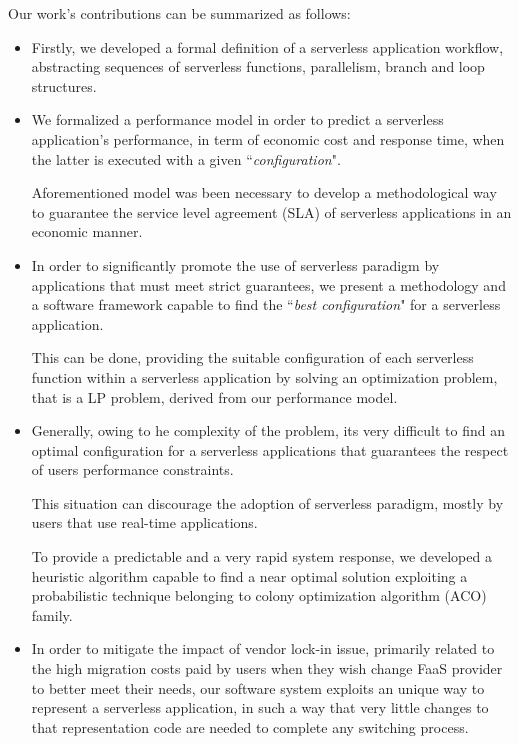 \documentclass[12pt,a4paper]{report}
\begin{document}
Our work's contributions can be summarized as follows:

\begin{itemize}
	\item Firstly, we developed a formal definition of a serverless application workflow, abstracting sequences of serverless functions, parallelism, branch and loop structures.
	
	\item We formalized a performance model in order to predict a serverless application's performance, in term of economic cost and response time, when the latter is executed with a given ``\textit{configuration}". 
	
	Aforementioned model was been necessary to develop a methodological way to guarantee the service level agreement (SLA) of serverless applications in an economic manner.
	
	\item In order to significantly promote the use of serverless paradigm by applications that must meet strict guarantees, we present a methodology and a software framework capable to find the ``\textit{best configuration}" for a serverless application.
	
	This can be done, providing the suitable configuration of each serverless function within a serverless application by solving an optimization
	problem, that is a LP problem, derived from our performance model.
	
	\item Generally, owing to he complexity of the problem, its very difficult to find an optimal configuration for a serverless applications that guarantees the respect of users performance constraints. 
	
	This situation can discourage the adoption of serverless paradigm, mostly by users that use real-time applications. 
	
	To provide a predictable and a very rapid system response, we developed a heuristic algorithm capable to find a near optimal solution exploiting a probabilistic technique belonging to colony optimization algorithm (ACO) family.  
	
	\item In order to mitigate the impact of vendor lock-in issue, primarily related to the high migration costs paid by users when they wish change FaaS provider to better meet their needs, our software system exploits an  unique way to represent a serverless application, in such a way that very little changes to that representation code are needed to complete any switching process.
	

\end{itemize}
\end{document}
